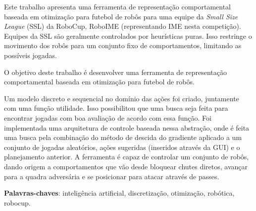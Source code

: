 \setlength{\absparsep}{18pt} %
\begin{resumo}

  Este trabalho apresenta uma ferramenta de representação comportamental baseada
  em otimização para futebol de robôs para uma equipe da \textit{Small Size
  League} (SSL) da RoboCup, RoboIME (representando IME nesta competição).
  Equipes da SSL são geralmente controlados por heurísticas puras. Isso
  restringe o movimento dos robôs para um conjunto fixo de comportamentos,
  limitando as possíveis jogadas.

  O objetivo deste trabalho é desenvolver uma ferramenta de representação
  comportamental baseada em otimização para futebol de robôs.

  Um modelo discreto e sequencial no domínio das ações foi criado, juntamente
  com uma função utilidade. Isso possibilitou que uma busca seja feita para
  encontrar jogadas com boa avaliação de acordo com essa função. Foi
  implementada uma arquitetura de controle baseada nessa abstração, onde é feita
  uma busca pela combinação do método de descida do gradiente aplicado a um
  conjunto de jogadas aleatórios, ações sugeridas (inseridos através da GUI) e o
  planejamento anterior. A ferramenta é capaz de controlar um conjunto de robôs,
  dando origem a comportamentos que vão desde bloquear chutes diretos, avançar
  para a quadra adversária e se posicionar para atacar através de passes.

  \textbf{Palavras-chaves}: inteligência artificial, discretização, otimização, robótica, robocup.
\end{resumo}

